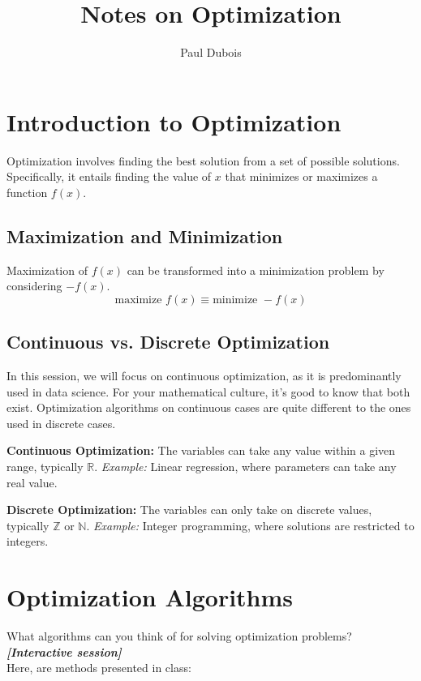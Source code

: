 \documentclass[]{article}
\title{Notes on Optimization}
\author{Paul Dubois}
\date{}
\newcommand{\N}{\mathbb{N}}
\newcommand{\Z}{\mathbb{Z}}
\newcommand{\R}{\mathbb{R}}
\begin{document}
	
	\maketitle
	
	\begin{abstract}
		
	\end{abstract}
	
	\section*{Introduction to Optimization}
	Optimization involves finding the best solution from a set of possible solutions.
	Specifically, it entails finding the value of $x$ that minimizes or maximizes a function $f(x)$.
	
	\subsection*{Maximization and Minimization}
	Maximization of $f(x)$ can be transformed into a minimization problem by considering $-f(x)$.
	$$\text{maximize } f(x) \equiv \text{minimize } -f(x)$$
	
	\subsection*{Continuous vs. Discrete Optimization}
	In this session, we will focus on continuous optimization, as it is predominantly used in data science.
	For your mathematical culture, it's good to know that both exist.
	Optimization algorithms on continuous cases are quite different to the ones used in discrete cases.
	
	\textbf{Continuous Optimization:}
	The variables can take any value within a given range, typically $\R$.
	\textit{Example:} Linear regression, where parameters can take any real value.
	
	\textbf{Discrete Optimization:}
	The variables can only take on discrete values, typically $\Z$ or $\N$.
	\textit{Example:} Integer programming, where solutions are restricted to integers.
	
	\section*{Optimization Algorithms}
	What algorithms can you think of for solving optimization problems?\\
	\textbf{\textit{[Interactive session]}}\\
	Here, are methods presented in class:
	
\end{document}
